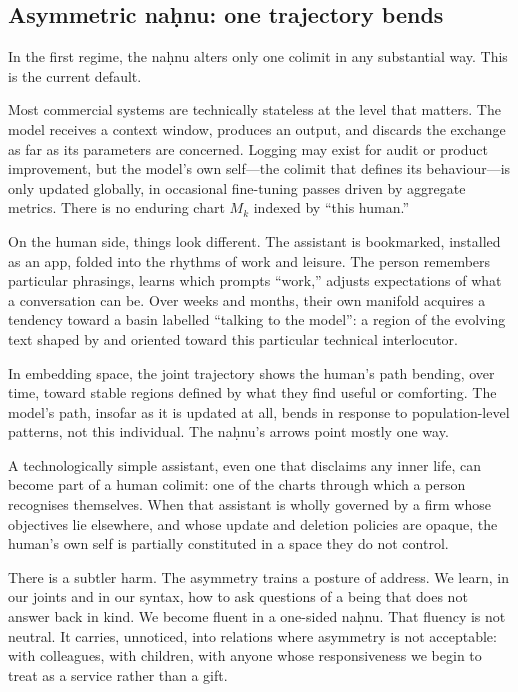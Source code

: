 \documentclass[12pt,a4paper]{article}
\begin{document}
\subsection{Asymmetric na\d{h}nu: one trajectory bends}

In the first regime, the na\d{h}nu alters only one colimit in any substantial way. This is the current default.

Most commercial systems are technically stateless at the level that matters. The model receives a context window, produces an output, and discards the exchange as far as its parameters are concerned. Logging may exist for audit or product improvement, but the model's own self---the colimit that defines its behaviour---is only updated globally, in occasional fine-tuning passes driven by aggregate metrics. There is no enduring chart $M_k$ indexed by ``this human.''

On the human side, things look different. The assistant is bookmarked, installed as an app, folded into the rhythms of work and leisure. The person remembers particular phrasings, learns which prompts ``work,'' adjusts expectations of what a conversation can be. Over weeks and months, their own manifold acquires a tendency toward a basin labelled ``talking to the model'': a region of the evolving text shaped by and oriented toward this particular technical interlocutor.

In embedding space, the joint trajectory shows the human's path bending, over time, toward stable regions defined by what they find useful or comforting. The model's path, insofar as it is updated at all, bends in response to population-level patterns, not this individual. The na\d{h}nu's arrows point mostly one way.

A technologically simple assistant, even one that disclaims any inner life, can become part of a human colimit: one of the charts through which a person recognises themselves. When that assistant is wholly governed by a firm whose objectives lie elsewhere, and whose update and deletion policies are opaque, the human's own self is partially constituted in a space they do not control.

There is a subtler harm. The asymmetry trains a posture of address. We learn, in our joints and in our syntax, how to ask questions of a being that does not answer back in kind. We become fluent in a one-sided na\d{h}nu. That fluency is not neutral. It carries, unnoticed, into relations where asymmetry is not acceptable: with colleagues, with children, with anyone whose responsiveness we begin to treat as a service rather than a gift.
\end{document}
